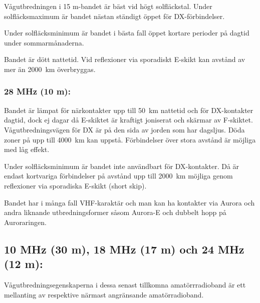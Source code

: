 Vågutbredningen i 15 m-bandet är bäst vid högt solfläckstal. Under
solfläcksmaximum är bandet nästan ständigt öppet för DX-förbindelser.

Under solfläcksminimum är bandet i bästa fall öppet kortare perioder
på dagtid under sommarmånaderna.

Bandet är dött nattetid. Vid reflexioner via sporadiskt E-skikt kan
avstånd av mer än 2000~km överbryggas.

\subsubsection{28 MHz (10 m):}

Bandet är lämpat för närkontakter upp till 50~km nattetid och för
DX-kontakter dagtid, dock ej dagar då E-skiktet är kraftigt joniserat
och skärmar av F-skiktet. Vågutbredningsvägen för DX är på den sida av
jorden som har dagsljus. Döda zoner på upp till 4000~km kan
uppstå. Förbindelser över stora avstånd är möjliga med låg effekt.

Under solfläcksminimum är bandet inte användbart för DX-kontakter. Då
är endast kortvariga förbindelser på avstånd upp till 2000~km möjliga
genom reflexioner via sporadiska E-skikt (short skip).

Bandet har i många fall VHF-karaktär och man kan ha kontakter via
Aurora och andra liknande utbredningsformer såsom Aurora-E och dubbelt
hopp på Auroraringen.

\subsection{10 MHz (30 m), 18 MHz (17 m) och 24 MHz (12 m):}

Vågutbredningsegenskaperna i dessa senast tillkomna amatörrradioband
är ett mellanting av respektive närmast angränsande amatörradioband.

